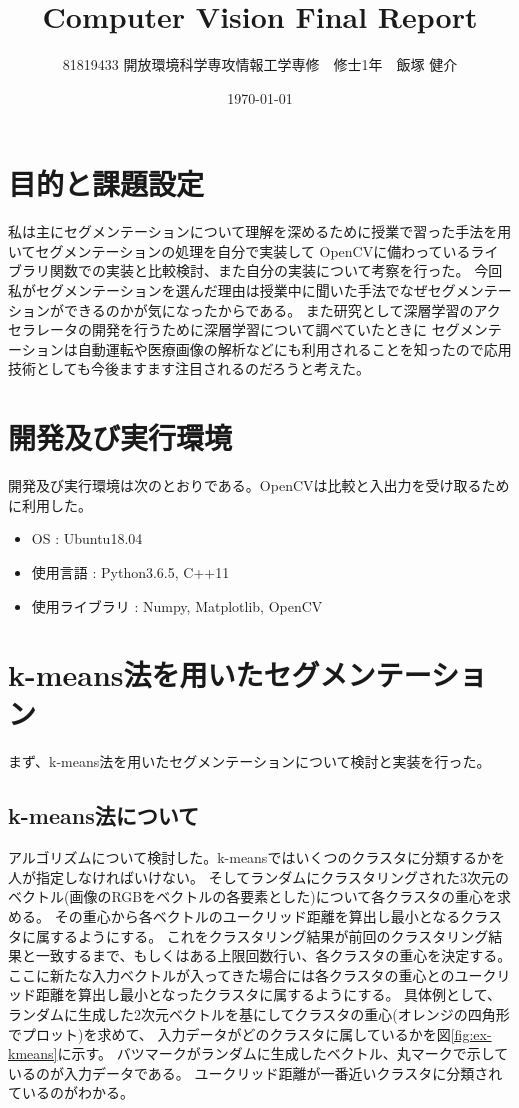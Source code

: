 \documentclass[11pt,a4j]{jsarticle}
\title{Computer Vision Final Report}
\author{81819433 開放環境科学専攻情報工学専修　修士1年　飯塚 健介}
\date{\today}
\begin{document}
    \maketitle

    \section{目的と課題設定}
    私は主にセグメンテーションについて理解を深めるために授業で習った手法を用いてセグメンテーションの処理を自分で実装して
    OpenCVに備わっているライブラリ関数での実装と比較検討、また自分の実装について考察を行った。
    今回私がセグメンテーションを選んだ理由は授業中に聞いた手法でなぜセグメンテーションができるのかが気になったからである。
    また研究として深層学習のアクセラレータの開発を行うために深層学習について調べていたときに
    セグメンテーションは自動運転や医療画像の解析などにも利用されることを知ったので応用技術としても今後ますます注目されるのだろうと考えた。



    \section{開発及び実行環境}
    開発及び実行環境は次のとおりである。OpenCVは比較と入出力を受け取るために利用した。
    \begin{itemize}
        \item OS : Ubuntu18.04 
        \item 使用言語 : Python3.6.5, C++11 
        \item 使用ライブラリ : Numpy, Matplotlib, OpenCV 
       \end{itemize}

    \section{k-means法を用いたセグメンテーション}
    まず、k-means法を用いたセグメンテーションについて検討と実装を行った。

    \subsection{k-means法について}
    アルゴリズムについて検討した。k-meansではいくつのクラスタに分類するかを人が指定しなければいけない。
    そしてランダムにクラスタリングされた3次元のベクトル(画像のRGBをベクトルの各要素とした)について各クラスタの重心を求める。
    その重心から各ベクトルのユークリッド距離を算出し最小となるクラスタに属するようにする。
    これをクラスタリング結果が前回のクラスタリング結果と一致するまで、もしくはある上限回数行い、各クラスタの重心を決定する。
    ここに新たな入力ベクトルが入ってきた場合には各クラスタの重心とのユークリッド距離を算出し最小となったクラスタに属するようにする。
    具体例として、ランダムに生成した2次元ベクトルを基にしてクラスタの重心(オレンジの四角形でプロット)を求めて、
    入力データがどのクラスタに属しているかを図\ref{fig:ex-kmeans}に示す。
    バツマークがランダムに生成したベクトル、丸マークで示しているのが入力データである。
    ユークリッド距離が一番近いクラスタに分類されているのがわかる。
\end{document}
